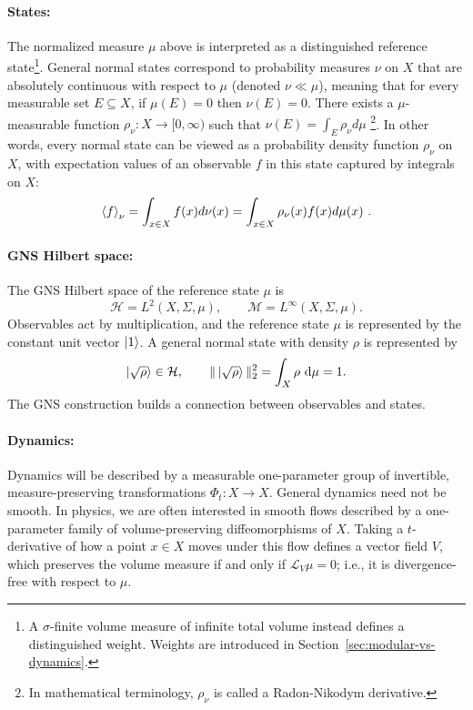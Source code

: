 \documentclass[a4paper,11pt]{article}
\theoremstyle{definition}
\newcommand{\dd}{\,\mathrm{d}}
\newcommand{\cH}{\mathcal{H}}
\begin{document}
\paragraph{States:} The normalized measure $\mu$ above is interpreted as a distinguished reference state\footnote{A $\sigma$-finite volume measure of infinite total volume instead defines a distinguished weight. Weights are introduced in Section~\ref{sec:modular-vs-dynamics}.}. General normal states correspond to probability measures $\nu$ on $X$ that are absolutely continuous with respect to $\mu$ (denoted $\nu\ll \mu$), meaning that for every measurable set $E\subseteq X$, if $\mu(E)=0$ then $\nu(E)=0$.
There exists a $\mu$-measurable function $\rho_\nu:X\to [0,\infty)$ such that $\nu(E)=\int_E \rho_\nu d\mu$ \footnote{In mathematical terminology, $\rho_\nu$ is called a Radon-Nikodym derivative.}. In other words, every normal state can be viewed as a probability density function $\rho_\nu$ on $X$, with expectation values of an observable $f$ in this state captured by integrals on $X$:
\begin{align}
\braket{f}_\nu=\int_{x\in X}f(x) d\nu(x)=\int_{x\in X} \rho_\nu(x) f(x) d\mu(x)\ .
\end{align}

\paragraph{GNS Hilbert space:} The GNS Hilbert space of the reference state $\mu$ is
\[
  \cH=L^2(X,\Sigma,\mu),
  \qquad
  \mathcal M=L^\infty(X,\Sigma,\mu).
\]
Observables act by multiplication, and the reference state $\mu$ is represented by the constant unit vector $\ket{1}$. A general normal state with density $\rho$ is represented by
\[
  \ket{\sqrt{\rho}}\in\cH,
  \qquad
  \|\ket{\sqrt{\rho}}\|_2^2=\int_X\rho\,\dd\mu=1.
\]
The GNS construction builds a connection between observables and states.


\paragraph{Dynamics:} Dynamics will be described by a measurable one-parameter group of invertible, measure-preserving transformations $\Phi_t:X\to X$. General dynamics need not be smooth. In physics, we are often interested in smooth flows described by a one-parameter family of volume-preserving diffeomorphisms of $X$. Taking a $t$-derivative of how a point $x\in X$ moves under this flow defines a vector field $V$, which preserves the volume measure if and only if $\mathcal{L}_V\mu=0$; i.e., it is divergence-free with respect to $\mu$.
\end{document}
